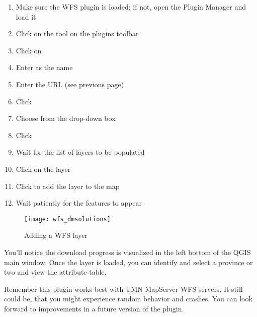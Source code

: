 \begin{enumerate}
  \item Make sure the WFS plugin is loaded; if not, open the Plugin Manager and load it
  \item Click on the  tool on the plugins toolbar
  \item Click on  
  \item Enter  as the name
  \item Enter the URL (see previous page)
  \item Click  
  \item Choose  from the drop-down box
  \item Click  
  \item Wait for the list of layers to be populated
  \item Click on the  layer
  \item Click  to add the layer to the map
  \item Wait patiently for the features to appear
\end{enumerate}

\begin{figure}[ht]
 \begin{center}
  \caption{Adding a WFS layer}\label{fig:wfs_dmsolutions}
  \texttt{[image: wfs\_dmsolutions]}
 \end{center}
\end{figure}

You'll notice the download progress is visualized in the left bottom of the QGIS main window. 
Once the layer is loaded, you can identify and select a province or two and view the 
attribute table.

Remember this plugin works best with UMN MapServer WFS servers. It still
could be, that you might experience random behavior 
and crashes. You can look forward to improvements in a future version of the plugin.

\begin{Tip}[ht]\caption{\textsc{Finding WMS and WFS Servers}}
\end{Tip} 
